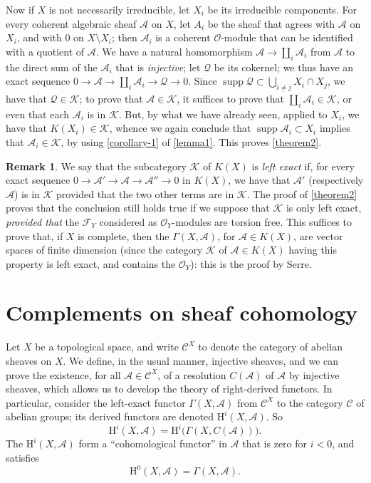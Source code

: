 \documentclass{article}
\theoremstyle{plain}
\theoremstyle{definition}
\newtheorem*{remark}{Remark}
\newcommand{\sh}{\mathscr}
\newcommand{\cat}{\mathcal}
\newcommand{\HH}{\mathrm{H}}
\newcommand{\supp}{\operatorname{supp}}
\newcommand{\oldpage}[1]{\marginpar{\footnotesize$\Big\vert$ \textit{p.~#1}}}
\begin{document}
Now if $X$ is not necessarily irreducible, let $X_i$ be its irreducible components.
For every coherent algebraic sheaf $\sh{A}$ on $X$, let $A_i$ be the sheaf that agrees with $\sh{A}$ on $X_i$, and with $0$ on $X\setminus X_i$;
then $\sh{A}_i$ is a coherent $\sh{O}$-module that can be identified with a quotient of $\sh{A}$.
We have a natural homomorphism $\sh{A}\to\coprod_i\sh{A}_i$ from $\sh{A}$ to the direct sum of the $\sh{A}_i$ that is \emph{injective};
let $\sh{Q}$ be its cokernel;
we thus have an exact sequence $0\to\sh{A}\to\coprod_i\sh{A}_i\to\sh{Q}\to0$.
Since $\supp\sh{Q}\subset\bigcup_{i\neq j}X_i\cap X_j$, we have that $\sh{Q}\in\cat{K}$;
to prove that $\sh{A}\in\cat{K}$, it suffices to prove that $\coprod_i\sh{A}_i\in\cat{K}$, or even that each $\sh{A}_i$ is in $\cat{K}$.
But, by what we have already seen, applied to $X_i$, we have that $K(X_i)\in\cat{K}$, whence we again conclude that $\supp\sh{A}_i\subset X_i$ implies that $\sh{A}_i\in\cat{K}$, by using \cref{corollary-1} of \cref{lemma1}.
This proves \cref{theorem2}.

\begin{remark}
  We say that the subcategory $\cat{K}$ of $K(X)$ is \emph{left exact} if, for every exact sequence $0\to\sh{A}'\to\sh{A}\to\sh{A}''\to0$ in $K(X)$, we have that $\sh{A}'$ (respectively $\sh{A}$) is in $\cat{K}$ provided that the two other terms are in $\cat{K}$.
  The proof of \cref{theorem2} proves that the conclusion still holds true if we suppose that $\cat{K}$ is only left exact, \emph{provided that} the $\sh{F}_Y$ considered as $\sh{O}_Y$-modules are torsion free.
  This suffices to prove that, if $X$ is complete, then the $\Gamma(X,\sh{A})$, for $\sh{A}\in K(X)$, are vector spaces of finite dimension (since the category $\cat{K}$ of $\sh{A}\in K(X)$ having this property is left exact, and contains the $\sh{O}_Y$): this is the proof by Serre.
\end{remark}


\section{Complements on sheaf cohomology}
\label{section3}

Let $X$ be a topological space, and write $\cat{C}^X$ to denote the category of abelian sheaves on $X$.
We define, in the usual manner, injective sheaves, and we can prove the existence, for all $\sh{A}\in\cat{C}^X$, of a resolution $C(\sh{A})$ of $\sh{A}$ by injective sheaves, which allows us to develop the theory of right-derived functors.
In particular, consider the left-exact functor $\Gamma(X,\sh{A})$
\oldpage{2-05}
from $\cat{C}^X$ to the category $\cat{C}$ of abelian groups;
its derived functors are denoted $\HH^i(X,\sh{A})$.
So
\[
  \HH^i(X,\sh{A}) = \HH^i\big(\Gamma(X,C(\sh{A}))\big).
\]
The $\HH^i(X,\sh{A})$ form a ``cohomological functor'' in $\sh{A}$ that is zero for $i<0$, and satisfies
\[
  \HH^0(X,\sh{A}) = \Gamma(X,\sh{A}).
\]
\end{document}
